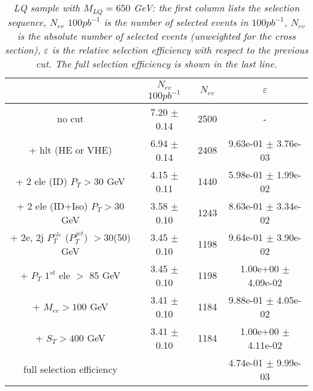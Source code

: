 \documentclass[colclass=cmspaper]{combine}
\begin{document}
\begin{linenumbers}


\begin{table}[htbp]
\begin{center}
\begin{tabular}{|c|c|c|c|}
\hline
\hline
 & $N_{ev}$ $100pb^{-1}$ & $N_{ev}$ & $\varepsilon$ \\
\hline
\hline

no cut &7.20 $\pm$ 0.14& 2500 & - \\
+ hlt (HE or VHE) &6.94 $\pm$ 0.14& 2408 & 9.63e-01 $\pm$ 3.76e-03\\
+ 2 ele (ID) $P_{T} >30$ GeV &4.15 $\pm$ 0.11& 1440 & 5.98e-01 $\pm$ 1.99e-02\\
+ 2 ele (ID+Iso) $P_{T} >30$ GeV &3.58 $\pm$ 0.10 & 1243 & 8.63e-01 $\pm$ 3.34e-02\\
+ 2e, 2j $P_{T}^{ele}$ ($P_{T}^{jet}$) $>$30(50) GeV &3.45 $\pm$ 0.10& 1198 & 9.64e-01 $\pm$ 3.90e-02\\
+ $P_{T}$ $1^{st}$ ele $>$ 85 GeV &3.45 $\pm$ 0.10& 1198 & 1.00e+00 $\pm$ 4.09e-02\\
+ $M_{ee} >100$ GeV&3.41 $\pm$ 0.10& 1184 & 9.88e-01 $\pm$ 4.05e-02\\
+ $S_{T} >400$ GeV &3.41 $\pm$ 0.10& 1184 & 1.00e+00 $\pm$ 4.11e-02\\
\hline

full selection efficiency& &  & 4.74e-01 $\pm$ 9.99e-03\\
\hline
\end{tabular}
\end{center}
\caption{\small \sl LQ sample with $M_{LQ}=650$ GeV: the first column lists the selection sequence, $N_{ev}$ $100pb^{-1}$ is the number of selected events in $100pb^{-1}$, $N_{ev}$ is the absolute number of selected events (unweighted for the cross section), $\varepsilon$ is the relative selection efficiency with respect to the previous cut. The full selection efficiency is shown in the last line.}
\label{tab:selection_effic_650}
\end{table}



\end{linenumbers}
\end{document}
